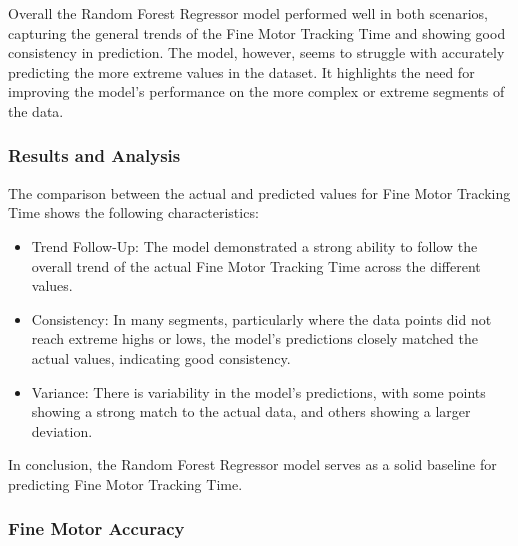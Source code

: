Overall the Random Forest Regressor model performed well in both scenarios, capturing the general trends of the Fine Motor Tracking Time and showing good consistency in prediction.
The model, however, seems to struggle with accurately predicting the more extreme values in the dataset. It highlights the need for improving the model's performance on the more complex
or extreme segments of the data.




\subsubsection*{Results and Analysis}
The comparison between the actual and predicted values for Fine Motor Tracking Time shows the following characteristics:

\begin{itemize}
    \item Trend Follow-Up: The model demonstrated a strong ability to follow the overall trend of the actual Fine Motor Tracking Time across the different values. 
    \item Consistency: In many segments, particularly where the data points did not reach extreme highs or lows, the model's predictions closely matched the actual values, indicating good consistency. 
    \item Variance: There is variability in the model's predictions, with some points showing a strong match to the actual data, and others showing a larger deviation.
\end{itemize}

In conclusion, the Random Forest Regressor model serves as a solid baseline for predicting Fine Motor Tracking Time.

\subsubsection*{Fine Motor Accuracy}



